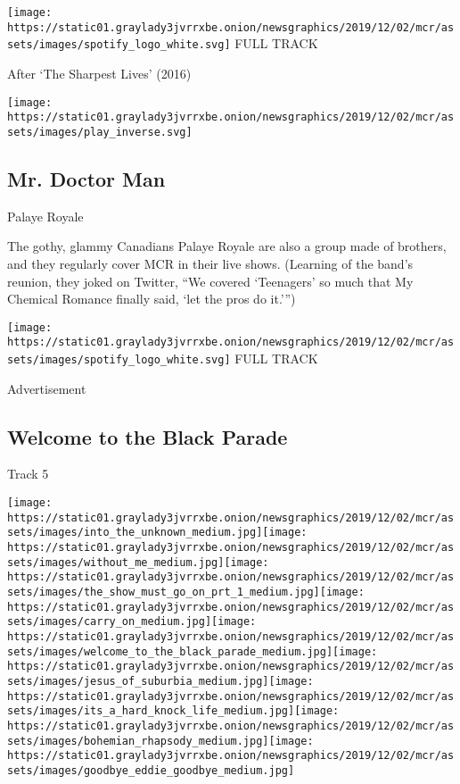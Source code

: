 \href{https://open.spotify.com/track/5UZYlzL88CUTsyxNIm44LF?si=-j35R-NNQ5WDXba3jU4WMg}{}

\texttt{[image: https://static01.graylady3jvrrxbe.onion/newsgraphics/2019/12/02/mcr/assets/images/spotify\_logo\_white.svg]}
FULL TRACK

After `The Sharpest Lives' (2016)

\texttt{[image: https://static01.graylady3jvrrxbe.onion/newsgraphics/2019/12/02/mcr/assets/images/play\_inverse.svg]}

\hypertarget{mr-doctor-man}{%
\subsection{Mr. Doctor Man}\label{mr-doctor-man}}

Palaye Royale

The gothy, glammy Canadians Palaye Royale are also a group made of
brothers, and they regularly cover MCR in their live shows. (Learning of
the band's reunion, they joked on Twitter, ``We covered `Teenagers' so
much that My Chemical Romance finally said, `let the pros do it.''')

\href{https://open.spotify.com/track/1yIMrzF45Ven2FzPFAr0Gg?si=QWqRl7AiTQiv-qcPLSyi-Q}{}

\texttt{[image: https://static01.graylady3jvrrxbe.onion/newsgraphics/2019/12/02/mcr/assets/images/spotify\_logo\_white.svg]}
FULL TRACK

Advertisement

\hypertarget{welcome-to-the-black-parade}{%
\subsection{Welcome to the Black
Parade}\label{welcome-to-the-black-parade}}

Track 5

\texttt{[image: https://static01.graylady3jvrrxbe.onion/newsgraphics/2019/12/02/mcr/assets/images/into\_the\_unknown\_medium.jpg]}\texttt{[image: https://static01.graylady3jvrrxbe.onion/newsgraphics/2019/12/02/mcr/assets/images/without\_me\_medium.jpg]}\texttt{[image: https://static01.graylady3jvrrxbe.onion/newsgraphics/2019/12/02/mcr/assets/images/the\_show\_must\_go\_on\_prt\_1\_medium.jpg]}\texttt{[image: https://static01.graylady3jvrrxbe.onion/newsgraphics/2019/12/02/mcr/assets/images/carry\_on\_medium.jpg]}\texttt{[image: https://static01.graylady3jvrrxbe.onion/newsgraphics/2019/12/02/mcr/assets/images/welcome\_to\_the\_black\_parade\_medium.jpg]}\texttt{[image: https://static01.graylady3jvrrxbe.onion/newsgraphics/2019/12/02/mcr/assets/images/jesus\_of\_suburbia\_medium.jpg]}\texttt{[image: https://static01.graylady3jvrrxbe.onion/newsgraphics/2019/12/02/mcr/assets/images/its\_a\_hard\_knock\_life\_medium.jpg]}\texttt{[image: https://static01.graylady3jvrrxbe.onion/newsgraphics/2019/12/02/mcr/assets/images/bohemian\_rhapsody\_medium.jpg]}\texttt{[image: https://static01.graylady3jvrrxbe.onion/newsgraphics/2019/12/02/mcr/assets/images/goodbye\_eddie\_goodbye\_medium.jpg]}

